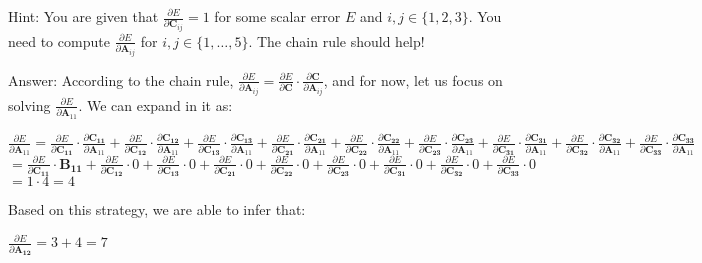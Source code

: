 \documentclass[12pt,letterpaper]{article}
\newcommand{\matr}[1]{\bm{#1}}     %
\begin{document}
\begin{itemize}
\begin{table}[!ht]
\end{table}
 Hint: You are given that $\frac{\partial E}{\partial \matr{C}_{ij}} = 1$ for some scalar error $E$ and $i,j\in\{1,2,3\}$. You need to compute $\frac{\partial E}{\partial \matr{A}_{ij}}$ for  $i,j\in\{1, \ldots, 5\}$. The chain rule should help!

 Answer: According to the chain rule, $\frac{\partial E}{\partial \matr{A}_{ij}} = \frac{\partial E}{\partial \matr{C}}\cdot \frac{\partial \matr{C}}{\partial \matr{A}_{ij}}$, and for now, let us focus on solving $\frac{\partial E}{\partial \matr{A}_{11}}$. We can expand in it as:
 \begin{center}
     $
     \frac{\partial E}{\partial \matr{A}_{11}} =
     \frac{\partial E}{\partial \matr{C_{11}}}\cdot \frac{\partial \matr{C_{11}}}{\partial \matr{A}_{11}} + 
     \frac{\partial E}{\partial \matr{C_{12}}}\cdot \frac{\partial \matr{C_{12}}}{\partial \matr{A}_{11}} +
     \frac{\partial E}{\partial \matr{C_{13}}}\cdot \frac{\partial \matr{C_{13}}}{\partial \matr{A}_{11}} +
     \frac{\partial E}{\partial \matr{C_{21}}}\cdot \frac{\partial \matr{C_{21}}}{\partial \matr{A}_{11}} +
     \frac{\partial E}{\partial \matr{C_{22}}}\cdot \frac{\partial \matr{C_{22}}}{\partial \matr{A}_{11}} +
     \frac{\partial E}{\partial \matr{C_{23}}}\cdot \frac{\partial \matr{C_{23}}}{\partial \matr{A}_{11}} +
     \frac{\partial E}{\partial \matr{C_{31}}}\cdot \frac{\partial \matr{C_{31}}}{\partial \matr{A}_{11}} +
     \frac{\partial E}{\partial \matr{C_{32}}}\cdot \frac{\partial \matr{C_{32}}}{\partial \matr{A}_{11}} +
     \frac{\partial E}{\partial \matr{C_{33}}}\cdot \frac{\partial \matr{C_{33}}}{\partial \matr{A}_{11}} 
     $\\
     $
     = \frac{\partial E}{\partial \matr{C_{11}}}\cdot
     \matr{B_{11}} + 
     \frac{\partial E}{\partial \matr{C_{12}}}\cdot 0 +
     \frac{\partial E}{\partial \matr{C_{13}}}\cdot 0 +
     \frac{\partial E}{\partial \matr{C_{21}}}\cdot 0 +
     \frac{\partial E}{\partial \matr{C_{22}}}\cdot 0 +
     \frac{\partial E}{\partial \matr{C_{23}}}\cdot 0 +
     \frac{\partial E}{\partial \matr{C_{31}}}\cdot 0 +
     \frac{\partial E}{\partial \matr{C_{32}}}\cdot 0 +
     \frac{\partial E}{\partial \matr{C_{33}}}\cdot 0
     $\\
     $
     = 1 \cdot 4 = 4
     $
 \end{center}Based on this strategy, we are able to infer that:
 \begin{center}
     $
     \frac{\partial E}{\partial \matr{A_{12}}} = 3 + 4 = 7
     $\\

\end{center}
\end{itemize}
\end{document}
